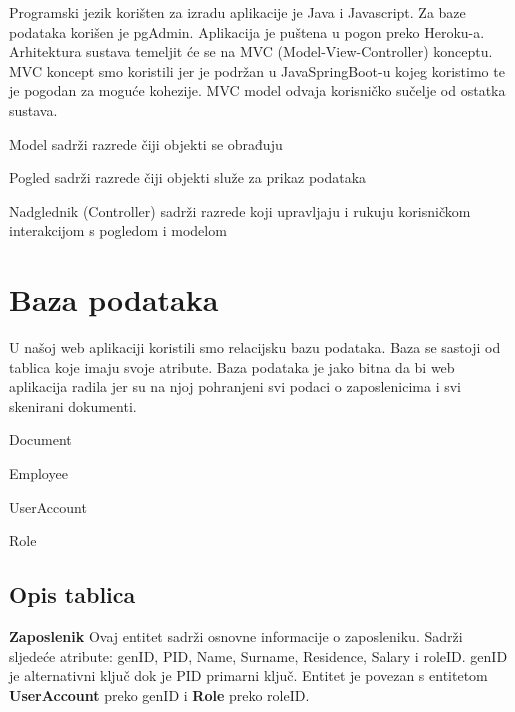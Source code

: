	 Programski jezik korišten za izradu aplikacije je Java i Javascript. Za baze podataka korišen je pgAdmin. Aplikacija je puštena u pogon preko Heroku-a.
	 Arhitektura sustava temeljit će se na MVC (Model-View-Controller) konceptu. MVC koncept smo koristili jer je podržan u JavaSpringBoot-u kojeg koristimo te je pogodan za moguće kohezije.
	 MVC model odvaja korisničko sučelje od ostatka sustava.
	\begin{packed_item}
		\item Model sadrži razrede čiji objekti se obrađuju

		\item Pogled sadrži razrede čiji objekti služe za prikaz podataka

		\item Nadglednik (Controller) sadrži razrede koji upravljaju i rukuju korisničkom interakcijom s pogledom i modelom

	\end{packed_item}
	
		\newpage		
		\section{Baza podataka}
			
		\text U našoj web aplikaciji koristili smo relacijsku bazu podataka. Baza se sastoji od tablica koje imaju svoje atribute. Baza podataka je jako bitna da bi web aplikacija radila jer su na njoj pohranjeni svi podaci o zaposlenicima i svi skenirani dokumenti.
		\newline
		\begin{packed_item}
			\item {Document}
			\item {Employee}
			\item {UserAccount}
			\item {Role}
		\end{packed_item}
	
		
			\subsection{Opis tablica}
			
			
			
			\textbf{Zaposlenik}  Ovaj entitet sadrži osnovne informacije o zaposleniku. Sadrži sljedeće atribute: genID, PID, Name, Surname, Residence, Salary i roleID. genID je alternativni ključ dok je PID primarni ključ. Entitet je povezan s entitetom \textbf{UserAccount} preko genID i \textbf{Role} preko roleID.
			
